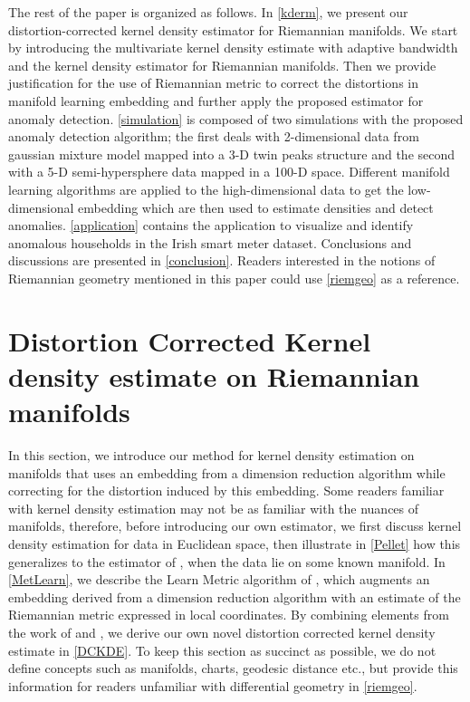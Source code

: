 \documentclass[11pt,a4paper,]{article}
\begin{document}
The rest of the paper is organized as follows. In \autoref{kderm}, we present our distortion-corrected kernel density estimator for Riemannian manifolds. We start by introducing the multivariate kernel density estimate with adaptive bandwidth and the kernel density estimator for Riemannian manifolds. Then we provide justification for the use of Riemannian metric to correct the distortions in manifold learning embedding and further apply the proposed estimator for anomaly detection. \autoref{simulation} is composed of two simulations with the proposed anomaly detection algorithm; the first deals with 2-dimensional data from gaussian mixture model mapped into a 3-D twin peaks structure and the second with a 5-D semi-hypersphere data mapped in a 100-D space. Different manifold learning algorithms are applied to the high-dimensional data to get the low-dimensional embedding which are then used to estimate densities and detect anomalies.
\autoref{application} contains the application to visualize and identify anomalous households in the Irish smart meter dataset. Conclusions and discussions are presented in \autoref{conclusion}. Readers interested in the notions of Riemannian geometry mentioned in this paper could use \autoref{riemgeo} as a reference.

\hypertarget{kderm}{%
\section{Distortion Corrected Kernel density estimate on Riemannian manifolds}\label{kderm}}

In this section, we introduce our method for kernel density estimation on manifolds that uses an embedding from a dimension reduction algorithm while correcting for the distortion induced by this embedding. Some readers familiar with kernel density estimation may not be as familiar with the nuances of manifolds, therefore, before introducing our own estimator, we first discuss kernel density estimation for data in Euclidean space, then illustrate in \autoref{Pellet} how this generalizes to the estimator of \textcite{Pelletier2005-vu}, when the data lie on some known manifold. In \autoref{MetLearn}, we describe the Learn Metric algorithm of \textcite{Perrault-Joncas2013-pq}, which augments an embedding derived from a dimension reduction algorithm with an estimate of the Riemannian metric expressed in local coordinates. By combining elements from the work of \textcite{Pelletier2005-vu} and \textcite{Perrault-Joncas2013-pq}, we derive our own novel distortion corrected kernel density estimate in \autoref{DCKDE}. To keep this section as succinct as possible, we do not define concepts such as manifolds, charts, geodesic distance etc., but provide this information for readers unfamiliar with differential geometry in \autoref{riemgeo}.
\end{document}
